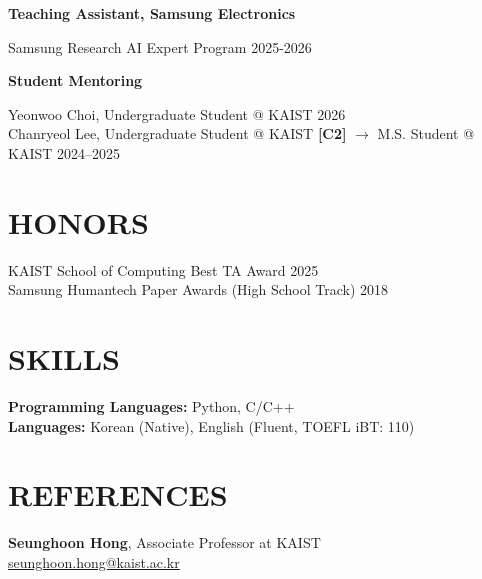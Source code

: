 \documentclass[a4paper,10pt]{extarticle}
\newcommand{\entryskip}{\smallskip}
\newcommand{\pubref}[1]{\textbf{[#1]}}
\begin{document}
\entryskip
\textbf{Teaching Assistant, Samsung Electronics}

Samsung Research AI Expert Program \hfill 2025-2026

\entryskip
\textbf{Student Mentoring}

Yeonwoo Choi, Undergraduate Student @ KAIST \hfill 2026 \\
Chanryeol Lee, Undergraduate Student @ KAIST \pubref{C2} $\rightarrow$ M.S. Student @ KAIST \hfill 2024--2025

\section*{HONORS}
KAIST School of Computing Best TA Award \hfill 2025 \\
Samsung Humantech Paper Awards (High School Track) \hfill 2018

\section*{SKILLS}
\textbf{Programming Languages:} Python, C/C++ \\
\textbf{Languages:} Korean (Native), English (Fluent, TOEFL iBT: 110)

\section*{REFERENCES}
\textbf{Seunghoon Hong}, Associate Professor at KAIST \\
\href{mailto:seunghoon.hong@kaist.ac.kr}{seunghoon.hong@kaist.ac.kr}
\end{document}
